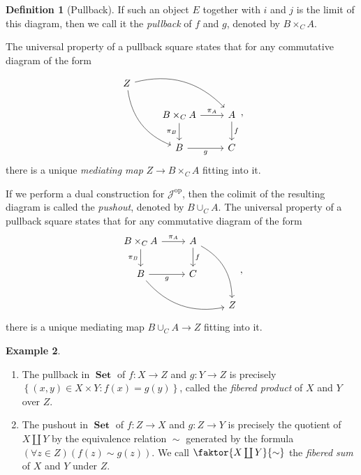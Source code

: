 \documentclass[10pt,letterpaper,cm]{nupset}
\theoremstyle{definition}
\newtheorem{definition}{Definition}[section]
\newtheorem{exmp}[definition]{Example}
\theoremstyle{theorem}
\theoremstyle{remark}
\newcommand{\1}{\mathbf{1}}
\renewcommand{\j}{\mathscr{J}}
\newcommand{\0}{\vec 0}
\DeclareMathOperator{\op}{op}
\DeclareMathOperator{\set}{\mathbf{Set}}
\begin{document}
\begin{definition}[Pullback]
If such an object $E$ together with $i$ and $j$ is the limit of this diagram, then we call it the \textit{pullback} of $f$ and $g$, denoted by $B \times_{C} A$.

The universal property of a pullback square states that for any commutative diagram of the form
\[
\begin{tikzcd}
Z \arrow[rdd, bend right] \arrow[rrd, bend left] &                                                   &                  \\
                                                 & B\times_CA \arrow[d, "\pi_B"'] \arrow[r, "\pi_A"] & A \arrow[d, "f"] \\
                                                 & B \arrow[r, "g"']                                 & C               
\end{tikzcd},
\] there is a unique \textit{mediating map} $ Z \to B\times_CA$ fitting into it.
\end{definition}


If we perform a dual construction for $\j^{\op}$, then the colimit of the resulting diagram is called the \textit{pushout}, denoted by $B \cup_{C} A$. The universal property of a pullback square states that for any commutative diagram of the form
\[
\begin{tikzcd}
B\times_CA \arrow[d, "\pi_B"'] \arrow[r, "\pi_A"] & A \arrow[d, "f"] \arrow[rdd, bend left] &   \\
B \arrow[r, "g"'] \arrow[rrd, bend right]         & C                                       &   \\
                                                  &                                         & Z
\end{tikzcd},
\] there is a unique mediating map $ B\cup_CA\to Z$ fitting into it.


\begin{exmp} $ $
\begin{enumerate}
\item The pullback in $\set$ of $f: X \to Z$ and $g: Y \to Z$ is precisely $\left\{\left(x,y\right) \in X \times Y : f(x) = g(y)\right\}$, called the \textit{fibered product} of $X$ and $Y$ over $Z$.
\item The pushout in $\set$ of $f: Z \to X$ and $g: Z \to Y$  is precisely the quotient of $X \coprod Y$ by the equivalence relation ${}\sim{}$ generated by the formula $\left(\forall{z\in Z}\right)\left(f(z) \sim g(z)\right)$. We call $\faktor{X \coprod Y}{\sim}$  the \textit{fibered sum} of $X$ and $Y$ under $Z$.
\end{enumerate}
\end{exmp}
\end{document}
